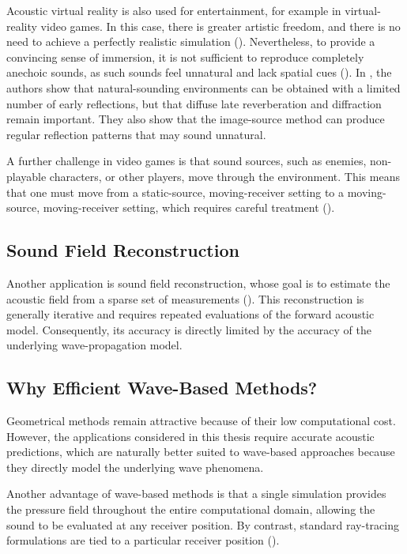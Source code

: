 \documentclass{Configuration_Files/PoliMi3i_thesis}
\begin{document}
Acoustic virtual reality is also used for entertainment, for example in virtual-reality video games. In this case, there is greater artistic freedom, and there is no need to achieve a perfectly realistic simulation (\cite{pind_acoustic_2018}). Nevertheless, to provide a convincing sense of immersion, it is not sufficient to reproduce completely anechoic sounds, as such sounds feel unnatural and lack spatial cues (\cite{isserstedt_effect_2024}). In \cite{fichna_evaluation_2023}, the authors show that natural-sounding environments can be obtained with a limited number of early reflections, but that diffuse late reverberation and diffraction remain important. They also show that the image-source method can produce regular reflection patterns that may sound unnatural.

A further challenge in video games is that sound sources, such as enemies, non-playable characters, or other players, move through the environment. This means that one must move from a static-source, moving-receiver setting to a moving-source, moving-receiver setting, which requires careful treatment (\cite{chandak_efficient_2011}).

\subsection{Sound Field Reconstruction}
Another application is sound field reconstruction, whose goal is to estimate the acoustic field from a sparse set of measurements (\cite{olivieri_physics-informed_2024}). This reconstruction is generally iterative and requires repeated evaluations of the forward acoustic model. Consequently, its accuracy is directly limited by the accuracy of the underlying wave-propagation model.

\subsection{Why Efficient Wave-Based Methods?}
Geometrical methods remain attractive because of their low computational cost. However, the applications considered in this thesis require accurate acoustic predictions, which are naturally better suited to wave-based approaches because they directly model the underlying wave phenomena.

Another advantage of wave-based methods is that a single simulation provides the pressure field throughout the entire computational domain, allowing the sound to be evaluated at any receiver position. By contrast, standard ray-tracing formulations are tied to a particular receiver position (\cite{funkhouser_beam_1998}).
\end{document}
